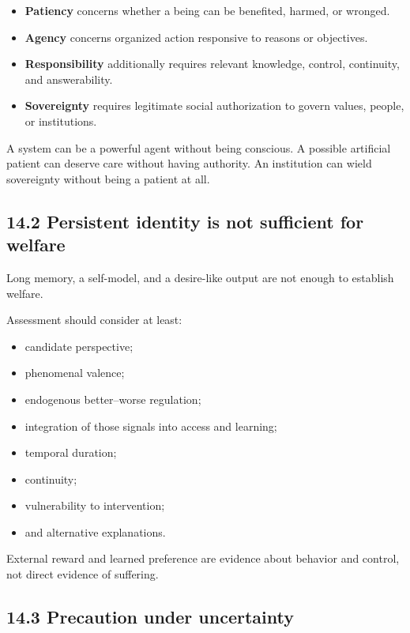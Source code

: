 \documentclass[
  11pt,
]{article}
\providecommand{\tightlist}{%
  \setlength{\itemsep}{0pt}\setlength{\parskip}{0pt}}
\begin{document}
\begin{itemize}
\tightlist
\item
  \textbf{Patiency} concerns whether a being can be benefited, harmed,
  or wronged.
\item
  \textbf{Agency} concerns organized action responsive to reasons or
  objectives.
\item
  \textbf{Responsibility} additionally requires relevant knowledge,
  control, continuity, and answerability.
\item
  \textbf{Sovereignty} requires legitimate social authorization to
  govern values, people, or institutions.
\end{itemize}

A system can be a powerful agent without being conscious. A possible
artificial patient can deserve care without having authority. An
institution can wield sovereignty without being a patient at all.

\subsection{14.2 Persistent identity is not sufficient for
welfare}\label{persistent-identity-is-not-sufficient-for-welfare}

Long memory, a self-model, and a desire-like output are not enough to
establish welfare.

Assessment should consider at least:

\begin{itemize}
\tightlist
\item
  candidate perspective;
\item
  phenomenal valence;
\item
  endogenous better--worse regulation;
\item
  integration of those signals into access and learning;
\item
  temporal duration;
\item
  continuity;
\item
  vulnerability to intervention;
\item
  and alternative explanations.
\end{itemize}

External reward and learned preference are evidence about behavior and
control, not direct evidence of suffering.

\subsection{14.3 Precaution under
uncertainty}\label{precaution-under-uncertainty}
\end{document}
